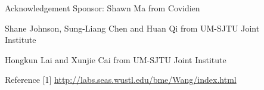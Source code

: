 \documentclass[final]{beamer}
\begin{document}
\begin{frame}
\begin{columns}[t]
\begin{column}{\colwidth}
\begin{tcolorbox}[width=\colwidth,height=\contentheight,top=.2in]
\begin{block}{Acknowledgement}
\small Sponsor: Shawn Ma from Covidien

Shane Johnson, Sung-Liang Chen and Huan Qi from UM-SJTU Joint Institute 

Hongkun Lai and Xunjie Cai from UM-SJTU Joint Institute 
\end{block}

\begin{block}{Reference}
\small 
[1] \url{http://labs.seas.wustl.edu/bme/Wang/index.html}
\end{block}


\end{tcolorbox}
\end{column}

\begin{column}{\marginwidth}\end{column} %

\end{columns}

\end{frame}
\end{document}
